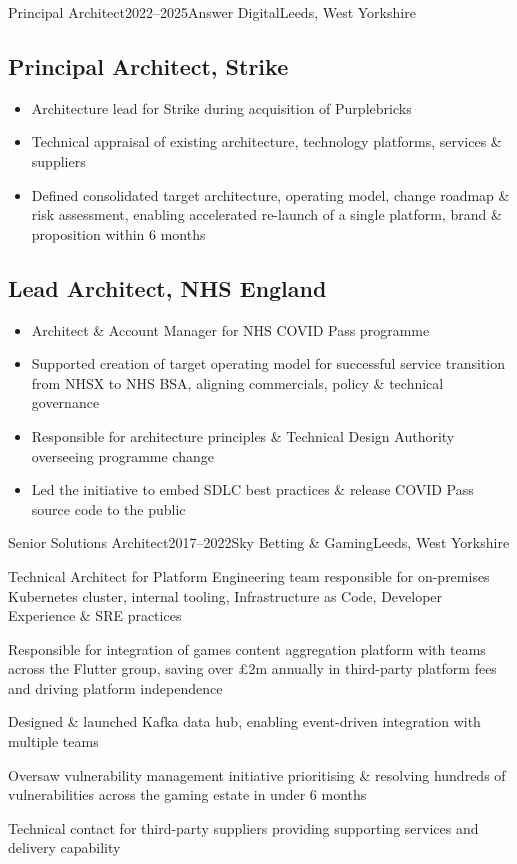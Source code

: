 \documentclass{cv}
\begin{document}
\begin{experienceplain}{Principal Architect}{2022--2025}{Answer Digital}{Leeds, West Yorkshire}
\subsection{Principal Architect, Strike} %
\begin{itemize}
\item Architecture lead for Strike during acquisition of Purplebricks
\item Technical appraisal of existing architecture, technology platforms, services \& suppliers
\item Defined consolidated target architecture, operating model, change roadmap \& risk
      assessment, enabling accelerated re-launch of a single platform, brand \& proposition within 6 months
\end{itemize}

\subsection{Lead Architect, NHS England} %
\begin{itemize}
\item Architect \& Account Manager for NHS COVID Pass programme
\item Supported creation of target operating model for successful service transition from NHSX to
      NHS BSA, aligning commercials, policy \& technical governance
\item Responsible for architecture principles \& Technical Design Authority overseeing programme change
\item Led the initiative to embed SDLC best practices \& release COVID Pass source code to
      the public
\end{itemize}
\end{experienceplain}


\begin{experience}{Senior Solutions Architect}{2017--2022}{Sky Betting \& Gaming}{Leeds, West Yorkshire}
\item Technical Architect for Platform Engineering team responsible for on-premises Kubernetes cluster,
      internal tooling, Infrastructure as Code, Developer Experience \& SRE practices
\item Responsible for integration of games content aggregation platform with teams across the Flutter group,
      saving over £2m annually in third-party platform fees and driving platform independence
\item Designed \& launched Kafka data hub, enabling event-driven integration with multiple teams
\item Oversaw vulnerability management initiative prioritising \& resolving hundreds of vulnerabilities
      across the gaming estate in under 6 months
\item Technical contact for third-party suppliers providing supporting services and delivery capability
\end{experience}
\end{document}
